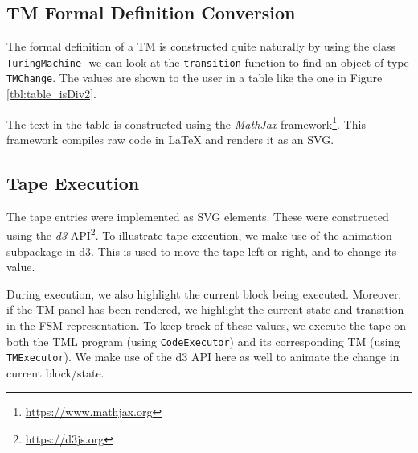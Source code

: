 \subsection{TM Formal Definition Conversion}
The formal definition of a TM is constructed quite naturally by using the class \texttt{TuringMachine}- we can look at the \texttt{transition} function to find an object of type \texttt{TMChange}. The values are shown to the user in a table like the one in Figure \ref{tbl:table_isDiv2}.

The text in the table is constructed using the \emph{MathJax} framework\footnote{\url{https://www.mathjax.org}}. This framework compiles raw code in LaTeX and renders it as an SVG.

\subsection{Tape Execution}

The tape entries were implemented as SVG elements. These were constructed using the \emph{d3} API\footnote{\url{https://d3js.org}}. To illustrate tape execution, we make use of the animation subpackage in d3. This is used to move the tape left or right, and to change its value. 

During execution, we also highlight the current block being executed. Moreover, if the TM panel has been rendered, we highlight the current state and transition in the FSM representation. To keep track of these values, we execute the tape on both the TML program (using \texttt{CodeExecutor}) and its corresponding TM (using \texttt{TMExecutor}). We make use of the d3 API here as well to animate the change in current block/state.
